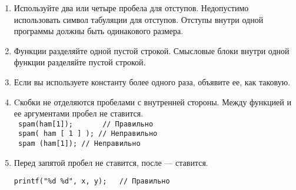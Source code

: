 \documentclass[11pt,a4paper,oneside]{article}
\begin{document}
\begin{enumerate}
    \item Используйте два или четыре пробела для отступов. 
          Недопустимо использовать символ табуляции для отступов. 
          Отступы внутри одной программы должны быть одинакового размера.
    \item Функции разделяйте одной пустой строкой. 
          Смысловые блоки внутри одной функции разделяйте пустой строкой.
    \item Если вы используете константу более одного раза, объявите ее, как таковую.
    \item Cкобки не отделяются пробелами с внутренней стороны. 
          Между функцией и ее аргументами пробел не ставится.
          \\ \texttt{ spam(ham[1]); \hbox{ } \hbox{ } \hbox{ } // Правильно}
          \\ \texttt{ spam( ham [ 1 ] ); // Неправильно}
          \\ \texttt{ spam (ham[1]); // Неправильно}
    \item Перед запятой пробел не ставится, после --- ставится.
          \begin{verbatim}
printf("%d %d", x, y);   // Правильно
            

\end{verbatim}
\end{enumerate}
\end{document}
